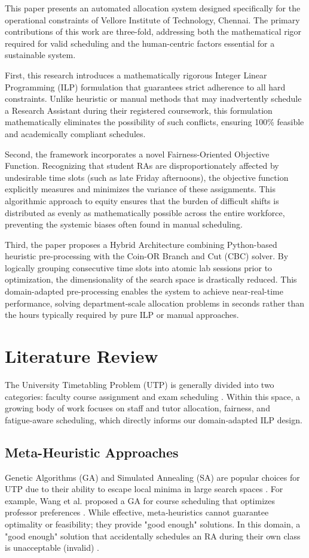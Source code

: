\documentclass[journal,onecolumn]{IEEEtran}
\begin{document}
This paper presents an automated allocation system designed specifically for the operational constraints of Vellore Institute of Technology, Chennai. The primary contributions of this work are three-fold, addressing both the mathematical rigor required for valid scheduling and the human-centric factors essential for a sustainable system.

First, this research introduces a mathematically rigorous Integer Linear Programming (ILP) formulation that guarantees strict adherence to all hard constraints. Unlike heuristic or manual methods that may inadvertently schedule a Research Assistant during their registered coursework, this formulation mathematically eliminates the possibility of such conflicts, ensuring 100\% feasible and academically compliant schedules.

Second, the framework incorporates a novel Fairness-Oriented Objective Function. Recognizing that student RAs are disproportionately affected by undesirable time slots (such as late Friday afternoons), the objective function explicitly measures and minimizes the variance of these assignments. This algorithmic approach to equity ensures that the burden of difficult shifts is distributed as evenly as mathematically possible across the entire workforce, preventing the systemic biases often found in manual scheduling.

Third, the paper proposes a Hybrid Architecture combining Python-based heuristic pre-processing with the Coin-OR Branch and Cut (CBC) solver. By logically grouping consecutive time slots into atomic lab sessions prior to optimization, the dimensionality of the search space is drastically reduced. This domain-adapted pre-processing enables the system to achieve near-real-time performance, solving department-scale allocation problems in seconds rather than the hours typically required by pure ILP or manual approaches.

\section{Literature Review}

The University Timetabling Problem (UTP) is generally divided into two categories: faculty course assignment and exam scheduling \cite{burke2004state, schaerf1999}. Within this space, a growing body of work focuses on staff and tutor allocation, fairness, and fatigue‑aware scheduling, which directly informs our domain‑adapted ILP design.

\subsection{Meta-Heuristic Approaches}
Genetic Algorithms (GA) and Simulated Annealing (SA) are popular choices for UTP due to their ability to escape local minima in large search spaces \cite{wang2005, burke2010}. For example, Wang et al. proposed a GA for course scheduling that optimizes professor preferences \cite{wang2005}. While effective, meta‑heuristics cannot guarantee optimality or feasibility; they provide "good enough" solutions. In this domain, a "good enough" solution that accidentally schedules an RA during their own class is unacceptable (invalid) \cite{pinedo, staff_scheduling}.
\end{document}

